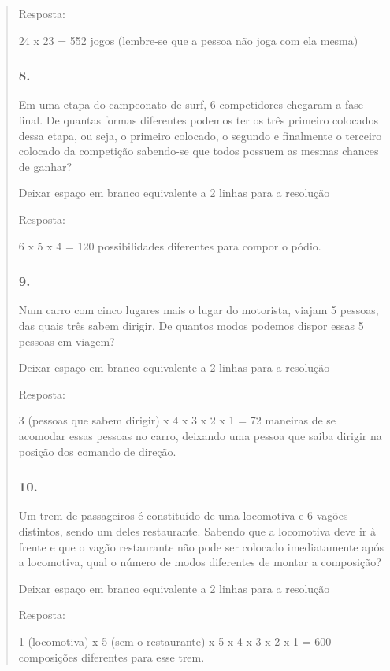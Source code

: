 \begin{enumerate}
\begin{escolha}
\begin{enumerate}
\begin{itemize}
\begin{itemize}
\begin{escolha}
\begin{quote}
\begin{escolha}
{Resposta:

24 x 23 = 552 jogos (lembre-se que a pessoa não joga com ela mesma)

\subsubsection{8.}\label{section-137}

Em uma etapa do campeonato de surf, 6 competidores chegaram a fase
final. De quantas formas diferentes podemos ter os três primeiro
colocados dessa etapa, ou seja, o primeiro colocado, o segundo e
finalmente o terceiro colocado da competição sabendo-se que todos
possuem as mesmas chances de ganhar?

Deixar espaço em branco equivalente a 2 linhas para a resolução

Resposta:

6 x 5 x 4 = 120 possibilidades diferentes para compor o pódio.

\subsubsection{9.}\label{section-138}

Num carro com cinco lugares mais o lugar do motorista, viajam 5 pessoas,
das quais três sabem dirigir. De quantos modos podemos dispor essas 5
pessoas em viagem?

Deixar espaço em branco equivalente a 2 linhas para a resolução

Resposta:

3 (pessoas que sabem dirigir) x 4 x 3 x 2 x 1 = 72 maneiras de se
acomodar essas pessoas no carro, deixando uma pessoa que saiba dirigir
na posição dos comando de direção.

\subsubsection{10.}\label{section-139}

Um trem de passageiros é constituído de uma locomotiva e 6 vagões
distintos, sendo um deles restaurante. Sabendo que a locomotiva deve ir
à frente e que o vagão restaurante não pode ser colocado imediatamente
após a locomotiva, qual o número de modos diferentes de montar a
composição?

Deixar espaço em branco equivalente a 2 linhas para a resolução

Resposta:

1 (locomotiva) x 5 (sem o restaurante) x 5 x 4 x 3 x 2 x 1 = 600
composições diferentes para esse trem.

}
\end{escolha}
\end{quote}
\end{escolha}
\end{itemize}
\end{itemize}
\end{enumerate}
\end{escolha}
\end{enumerate}
